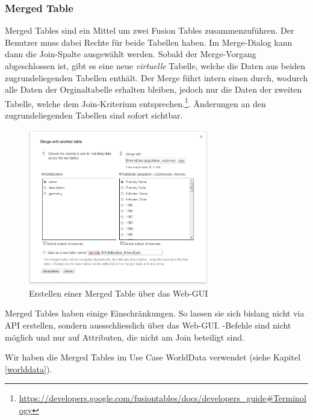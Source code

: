 \subsubsection{Merged Table}
\label{merge-table}
\gls{Merge}d Tables sind ein Mittel um zwei Fusion Tables zusammenzuführen. Der Benutzer muss dabei Rechte für beide Tabellen haben. Im \gls{Merge}-Dialog kann dann die Join-Spalte ausgewählt werden. Sobald der \gls{Merge}-Vorgang abgeschlossen ist, gibt es eine neue \emph{virtuelle} Tabelle, welche die Daten aus beiden zugrundeliegenden Tabellen enthält. Der \gls{Merge} führt intern einen  durch, wodurch alle Daten der Orginaltabelle erhalten bleiben, jedoch nur die Daten der zweiten Tabelle, welche dem Join-Kriterium entsprechen.\footnote{ \url{https://developers.google.com/fusiontables/docs/developers_guide\#Terminology}}. Änderungen an den zugrundeliegenden Tabellen sind sofort sichtbar.

\begin{figure}[!ht]
	\centering
	\includegraphics[width=0.7\textwidth]{images/usecase1-worlddata/documentation/worlddata-merge2}
	\caption{Erstellen einer \gls{Merge}d Table über das Web-GUI}
	\label{create-merge-table}
\end{figure}

\gls{Merge}d Tables haben einige Einschränkungen. So lassen sie sich bislang nicht via API erstellen, sondern aussschliesslich über das Web-GUI. -Befehle sind nicht möglich und  nur auf Attributen, die nicht am Join beteiligt sind.

Wir haben die \gls{Merge}d Tables im Use Case WorldData verwendet (siehe Kapitel \ref{worlddata}).

